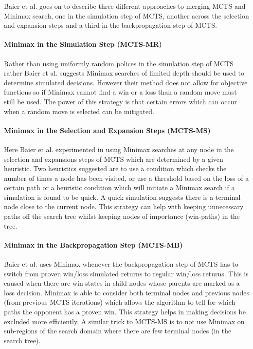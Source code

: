 \documentclass [11pt]{article}
\begin{document}
	\noindent Baier et al. \cite{hybrids} goes on to describe three different approaches to merging MCTS and Minimax search, one in the simulation step of MCTS, another across the selection and expansion steps and a third in the backpropagation step of MCTS.
	\\\\
	\noindent \textbf{Minimax in the Simulation Step (MCTS-MR)}\\\\
	Rather than using uniformly random polices in the simulation step of MCTS rather Baier et al. \cite{hybrids} suggests Minimax searches of limited depth should be used to determine simulated decisions. However their method does not allow for objective functions so if Minimax cannot find a win or a loss than a random move must still be used. The power of this strategy is that certain errors which can occur when a random move is selected can be mitigated.
	\\\\
	\noindent \textbf{Minimax in the Selection and Expansion Steps (MCTS-MS)}\\\\
	Here Baier et al. \cite{hybrids} experimented in using Minimax searches at any node in the selection and expansions steps of MCTS which are determined by a given heuristic. Two heuristics suggested are to use a condition which checks the number of times a node has been visited, or use a threshold based on the loss of a certain path or a heuristic condition which will initiate a Minimax search if a simulation is found to be quick. A quick simulation suggests there is a terminal node close to the current node. This strategy can help with keeping unnecessary paths off the search tree whilst keeping nodes of importance (win-paths) in the tree.
	\\\\
	\noindent \noindent \textbf{Minimax in the Backpropagation Step (MCTS-MB)}\\\\
	Baier et al. \cite{hybrids} uses Minimax whenever the backpropagation step of MCTS has to switch from proven win/loss simulated returns to regular win/loss returns. This is caused when there are win states in child nodes whose parents are marked as a loss decision. Minimax is able to consider both terminal nodes and previous nodes (from previous MCTS iterations) which allows the algorithm to tell for which paths the opponent has a proven win. This strategy helps in making decisions be excluded more efficiently. A similar trick to MCTS-MS is to not use Minimax on sub-regions of the search domain where there are few terminal nodes (in the search tree).\\
	
\end{document}
